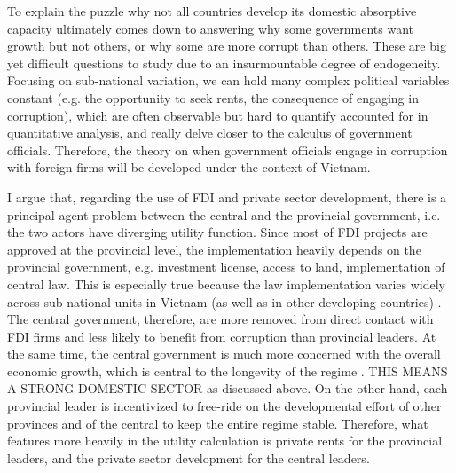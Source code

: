 \documentclass[12pt]{article}
\begin{document}
To explain the puzzle why not all countries develop its domestic absorptive capacity ultimately comes down to answering why some governments want growth but not others, or why some are more corrupt than others. These are big yet difficult questions to study due to an insurmountable degree of endogeneity. Focusing on sub-national variation, we can hold many complex political variables constant (e.g. the opportunity to seek rents, the consequence of engaging in corruption), which are often observable but hard to quantify accounted for in quantitative analysis, and really delve closer to the calculus of government officials. Therefore, the theory on when government officials engage in corruption with foreign firms will be developed under the context of Vietnam.

I argue that, regarding the use of FDI and private sector development, there is a principal-agent problem between the central and the provincial government, i.e. the two actors have diverging utility function. Since most of FDI projects are approved at the provincial level, the implementation heavily depends on the provincial government, e.g. investment license, access to land, implementation of central law. This is especially true because the law implementation varies widely across sub-national units in Vietnam (as well as in other developing countries) \citep{Meyer2005, Thun2006}. The central government, therefore, are more removed from direct contact with FDI firms and less likely to benefit from corruption than provincial leaders. At the same time, the central government is much more concerned with the overall economic growth, which is central to the longevity of the regime \citep{Malesky2008}. THIS MEANS A STRONG DOMESTIC SECTOR as discussed above. On the other hand, each provincial leader is incentivized to free-ride on the developmental effort of other provinces and of the central to keep the entire regime stable. Therefore, what features more heavily in the utility calculation is private rents for the provincial leaders, and the private sector development for the central leaders.
\end{document}
